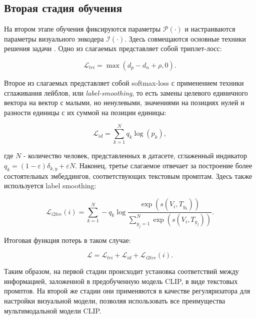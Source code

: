 \subsection{Вторая стадия обучения}

На втором этапе обучения фиксируются параметры $\mathcal P(\cdot)$ и настраиваются параметры визуального энкодера $\mathcal I(\cdot)$. Здесь совмещаются основные техники решения задачи \reid. Одно из слагаемых представляет собой триплет-лосс:

\begin{equation}\label{eq:Ltri}
	\mathcal L_{tri} = \max \left( d_p - d_n + \rho, 0 \right).
\end{equation}

Второе из слагаемых представляет собой softmax-loss с применением техники сглаживания лейблов, или \textit{label-smoothing},  то есть замены целевого единичного вектора на вектор с малыми, но ненулевыми, значениями на позициях нулей и разности единицы с их суммой на позиции единицы:

\begin{equation}\label{eq:Lid}
	\mathcal L_{id} = \sum \limits_{k = 1}^N q_k \log(p_k),
\end{equation}

где $N$ - количество человек, представленных в датасете, сглаженный индикатор $q_k = (1 - \varepsilon) \delta_{k, y} + \varepsilon N$. Наконец, третье слагаемое отвечает за построение более состоятельных эмбеддингов, соответствующих текстовым промптам. Здесь также используется label smoothing:

\begin{equation}\label{eq:Li2tce}
	\mathcal L_{i2tce}(i) = \sum \limits_{k = 1}^N -q_k \log \frac{\exp \left( s(V_i, T_{y_k}) \right)}{\sum_{y_j = 1}^N \exp \left( s(V_i, T_{y_j}) \right)}.
\end{equation}

Итоговая функция потерь в таком случае:

\begin{equation}
	\mathcal L = \mathcal L_{tri} + \mathcal L_{id} + \mathcal L_{i2tce}(i).
\end{equation}

Таким образом, на первой стадии происходит установка соответствий между информацией, заложенной в предобученную модель CLIP, в виде текстовых промптов. На второй же стадии они применяются в качестве регуляризатора для настройки визуальной модели, позволяя использовать все преимущества мультимодальной модели CLIP.






